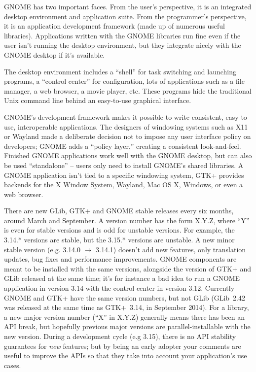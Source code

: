 GNOME has two important faces. From the user's perspective, it is an integrated desktop environment and application suite. From the programmer's perspective, it is an application development framework (made up of numerous useful libraries). Applications written with the GNOME libraries run fine even if the user isn't running the desktop environment, but they integrate nicely with the GNOME desktop if it's available.

The desktop environment includes a ``shell'' for task switching and launching programs, a ``control center'' for configuration, lots of applications such as a file manager, a web browser, a movie player, etc. These programs hide the traditional Unix command line behind an easy-to-use graphical interface.

GNOME's development framework makes it possible to write consistent, easy-to-use, interoperable applications. The designers of windowing systems such as X11 or Wayland made a deliberate decision not to impose any user interface policy on developers; GNOME adds a ``policy layer,'' creating a consistent look-and-feel. Finished GNOME applications work well with the GNOME desktop, but can also be used ``standalone'' -- users only need to install GNOME's shared libraries. A GNOME application isn't tied to a specific windowing system, GTK+ provides backends for the X Window System, Wayland, Mac OS X, Windows, or even a web browser.

There are new GLib, GTK+ and GNOME stable releases every six months, around March and September. A version number has the form X.Y.Z, where ``Y'' is even for stable versions and is odd for unstable versions. For example, the 3.14.* versions are stable, but the 3.15.* versions are unstable. A new minor stable version (e.g. 3.14.0 $\rightarrow$ 3.14.1) doesn't add new features, only translation updates, bug fixes and performance improvements. GNOME components are meant to be installed with the same versions, alongside the version of GTK+ and GLib released at the same time; it's for instance a bad idea to run a GNOME application in version 3.14 with the control center in version 3.12. Currently GNOME and GTK+ have the same version numbers, but not GLib (GLib~2.42 was released at the same time as GTK+~3.14, in September 2014). For a library, a new major version number (``X'' in X.Y.Z) generally means there has been an API break, but hopefully previous major versions are parallel-installable with the new version. During a development cycle (e.g 3.15), there is no API stability guarantees for \emph{new} features; but by being an early adopter your comments are useful to improve the APIs so that they take into account your application's use cases.

